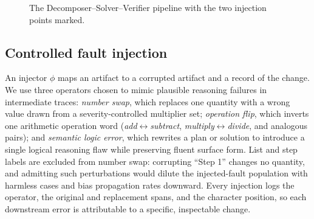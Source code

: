 \documentclass{article}
\begin{document}
\begin{figure}[t]
{
}
\caption{The Decomposer--Solver--Verifier pipeline with the two injection points marked.}
\label{fig:pipeline}
\end{figure}

\subsection{Controlled fault injection}
\label{sec:injection}
An injector $\phi$ maps an artifact to a corrupted artifact and a record of
the change. We use three operators chosen to mimic plausible reasoning
failures in intermediate traces: \emph{number swap}, which replaces one
quantity with a wrong value drawn from a severity-controlled multiplier set;
\emph{operation flip}, which inverts one arithmetic operation word
(\emph{add}$\leftrightarrow$\emph{subtract},
\emph{multiply}$\leftrightarrow$\emph{divide}, and analogous pairs); and
\emph{semantic logic error}, which rewrites a plan or solution to introduce a
single logical reasoning flaw while preserving fluent surface form. List and
step labels are excluded from number swap: corrupting ``Step 1'' changes no
quantity, and admitting such perturbations would dilute the injected-fault
population with harmless cases and bias propagation rates downward. Every
injection logs the operator, the original and replacement spans, and the
character position, so each downstream error is attributable to a specific,
inspectable change.
\end{document}
